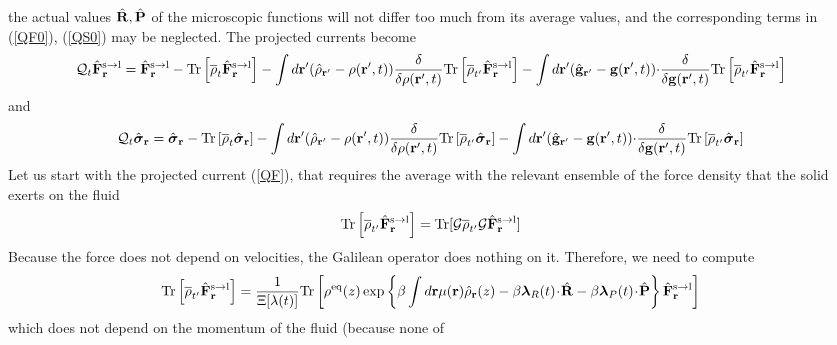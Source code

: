 \documentclass[b5paper,openright,11pt]{book}
\newcommand{\esc}{\!\cdot\!}
\begin{document}
\begin{appendices}
the  actual  values  $\hat{\bf  R},\hat{\bf  P}$  of  the  microscopic
functions will  not differ too much  from its average values,  and the
corresponding terms in (\ref{QF0}), (\ref{QS0}) may be neglected. The projected
currents become
\begin{align}
  {\cal Q}_t\hat{\bf F}^{\rm s\to l}_{{\bf r}}&=
\hat{\bf F}^{\rm s\to l}_{{\bf r}}- {\rm Tr}\left[\overline{\rho}_{t} \hat{\bf F}^{\rm s\to l}_{{\bf r}}\right]
-\int d{\bf r}'(\hat{\rho}_{{\bf r}'}-\rho({\bf r}',t))
\frac{\delta}{\delta \rho({\bf r}',t)}{\rm Tr}\left[\overline{\rho}_{t'}  \hat{\bf F}^{\rm s\to l}_{{\bf r}}\right]
-\int d{\bf r}'(\hat{\bf g}_{{\bf r}'}-{\bf g}({\bf r}',t)){\cdot}
\frac{\delta}{\delta {\bf g}({\bf r}',t)}{\rm Tr}\left[\overline{\rho}_{t'}  \hat{\bf F}^{\rm s\to l}_{{\bf r}}\right]
\label{QF}
\end{align}
and 
\begin{align}
  {\cal Q}_t\hat{\boldsymbol{\sigma}}_{{\bf r}}&=
\hat{\boldsymbol{\sigma}}_{{\bf r}}- {\rm Tr}\left[\overline{\rho}_{t} \hat{\boldsymbol{\sigma}}_{{\bf r}}\right]
-\int d{\bf r}'(\hat{\rho}_{{\bf r}'}-\rho({\bf r}',t))
\frac{\delta}{\delta \rho({\bf r}',t)}{\rm Tr}\left[\overline{\rho}_{t'}\hat{\boldsymbol{\sigma}}_{{\bf r}}\right]
-\int d{\bf r}'(\hat{\bf g}_{{\bf r}'}-{\bf g}({\bf r}',t))
{\cdot}
\frac{\delta}{\delta {\bf g}({\bf r}',t)}{\rm Tr}\left[\overline{\rho}_{t'}  \hat{\boldsymbol{\sigma}}_{{\bf r}}\right]
\label{QS1}
\end{align}
Let us start with the  projected current (\ref{QF}), that requires the
average with the relevant ensemble of the force density that the solid
exerts on the fluid
\begin{align}
  {\rm Tr}\left[\overline{\rho}_{t'}  \hat{\bf F}^{\rm s\to l}_{{\bf r}}\right]&=
  {\rm Tr}[{\cal G}\overline{\rho}_{t'} {\cal G} \hat{\bf F}^{\rm s\to l}_{{\bf r}}]
\end{align}
Because the force does not depend on velocities, the Galilean operator does nothing on it.
Therefore, we need to compute 
\begin{align}
    {\rm Tr}\left[\overline{\rho}_{t'}  \hat{\bf F}^{\rm s\to l}_{{\bf r}}\right]&=
\frac{1}{\Xi[\lambda(t)]}    {\rm Tr}\left[\rho^{\rm eq}(z)
\exp\left\{\beta\int d{\bf r}\mu({\bf r})\hat{\rho}_{\bf r}(z)
-\beta \boldsymbol{\lambda}_{R}(t)\esc\hat{\bf R}
-\beta \boldsymbol{\lambda}_{P}(t)\esc\hat{\bf P}\right\}
 \hat{\bf F}^{\rm s\to l}_{{\bf r}}\right]
\label{nogal}
\end{align}
which does  not depend on the  momentum of the fluid  (because none of

\end{appendices}
\end{document}
